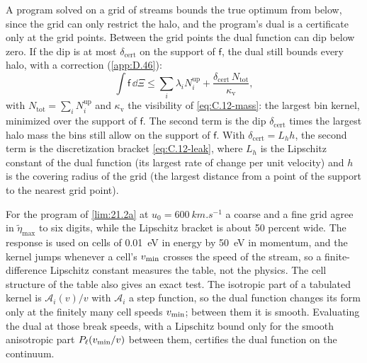A program solved on a grid of streams bounds the true optimum from below, since the grid can only restrict the halo, and the program's dual is a certificate only at the grid points. Between the grid points the dual function can dip below zero. If the dip is at most $\delta_{\mathrm{cert}}$ on the support of $\mathsf{f}$, the dual still bounds every halo, with a correction (\cref{app:D.46}):
\begin{equation}
  \int\mathsf{f}\,\dd\Xi \le \sum_i\lambda_iN_i^{\mathrm{up}} + \frac{\delta_{\mathrm{cert}}\,N_{\mathrm{tot}}}{\kappa_{\mathrm{v}}} ,
  \label{eq:21.2-defect}
\end{equation}
with $N_{\mathrm{tot}} = \sum_iN_i^{\mathrm{up}}$ and $\kappa_{\mathrm{v}}$ the visibility of \cref{eq:C.12-mass}: the largest bin kernel, minimized over the support of $\mathsf{f}$. The second term is the dip $\delta_{\mathrm{cert}}$ times the largest halo mass the bins still allow on the support of $\mathsf{f}$. With $\delta_{\mathrm{cert}} = L_hh$, the second term is the discretization bracket \cref{eq:C.12-leak}, where $L_h$ is the Lipschitz constant of the dual function (its largest rate of change per unit velocity) and $h$ is the covering radius of the grid (the largest distance from a point of the support to the nearest grid point).

For the program of \cref{lim:21.2a} at $u_0 = \SI{600}{km.s^{-1}}$ a coarse and a fine grid agree in $\tilde\eta_{\max}$ to six digits, while the Lipschitz bracket is about 50 percent wide. The response is used on cells of \SI{0.01}{eV} in energy by \SI{50}{eV} in momentum, and the kernel jumps whenever a cell's $v_{\mathrm{min}}$ crosses the speed of the stream, so a finite-difference Lipschitz constant measures the table, not the physics. The cell structure of the table also gives an exact test. The isotropic part of a tabulated kernel is $\mathcal{A}_i(v)/v$ with $\mathcal{A}_i$ a step function, so the dual function changes its form only at the finitely many cell speeds $v_{\mathrm{min}}$; between them it is smooth. Evaluating the dual at those break speeds, with a Lipschitz bound only for the smooth anisotropic part $P_\ell(v_{\mathrm{min}}/v)$ between them, certifies the dual function on the continuum.

